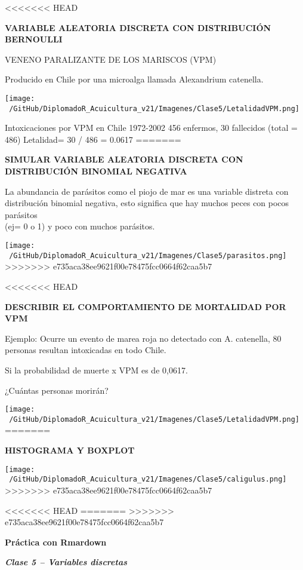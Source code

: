 \documentclass[ignorenonframetext,]{beamer}
\begin{document}
\begin{frame}{}
<<<<<<< HEAD
\protect\hypertarget{section-13}{}

\textbf{VARIABLE ALEATORIA DISCRETA CON DISTRIBUCIÓN BERNOULLI}

VENENO PARALIZANTE DE LOS MARISCOS (VPM)

Producido en Chile por una microalga llamada Alexandrium catenella.

\texttt{[image: ~/GitHub/DiplomadoR\_Acuicultura\_v21/Imagenes/Clase5/LetalidadVPM.png]}

Intoxicaciones por VPM en Chile 1972-2002 456 enfermos, 30 fallecidos
(total = 486) Letalidad= 30 / 486 = 0.0617
=======
\protect\hypertarget{section-11}{}

\textbf{SIMULAR VARIABLE ALEATORIA DISCRETA CON DISTRIBUCIÓN BINOMIAL
NEGATIVA}

La abundancia de parásitos como el piojo de mar es una variable distreta
con distribución binomial negativa, esto significa que hay muchos peces
con pocos parásitos\\
(ej= 0 o 1) y poco con muchos parásitos.

\texttt{[image: ~/GitHub/DiplomadoR\_Acuicultura\_v21/Imagenes/Clase5/parasitos.png]}
>>>>>>> e735aca38ee9621f00e78475fcc0664f62caa5b7

\end{frame}

\begin{frame}{}
<<<<<<< HEAD
\protect\hypertarget{section-14}{}

\textbf{DESCRIBIR EL COMPORTAMIENTO DE MORTALIDAD POR VPM}

Ejemplo: Ocurre un evento de marea roja no detectado con A. catenella,
80 personas resultan intoxicadas en todo Chile.

Si la probabilidad de muerte x VPM es de 0,0617.

¿Cuántas personas morirán?

\texttt{[image: ~/GitHub/DiplomadoR\_Acuicultura\_v21/Imagenes/Clase5/LetalidadVPM.png]}
=======
\protect\hypertarget{section-12}{}

\textbf{HISTOGRAMA Y BOXPLOT}

\texttt{[image: ~/GitHub/DiplomadoR\_Acuicultura\_v21/Imagenes/Clase5/caligulus.png]}
>>>>>>> e735aca38ee9621f00e78475fcc0664f62caa5b7

\end{frame}

\begin{frame}{}
<<<<<<< HEAD
\protect\hypertarget{section-15}{}
=======
\protect\hypertarget{section-13}{}
>>>>>>> e735aca38ee9621f00e78475fcc0664f62caa5b7

\textbf{Práctica con Rmardown}

\textbf{\emph{Clase 5 -- Variables discretas}}

\end{frame}
\end{document}
